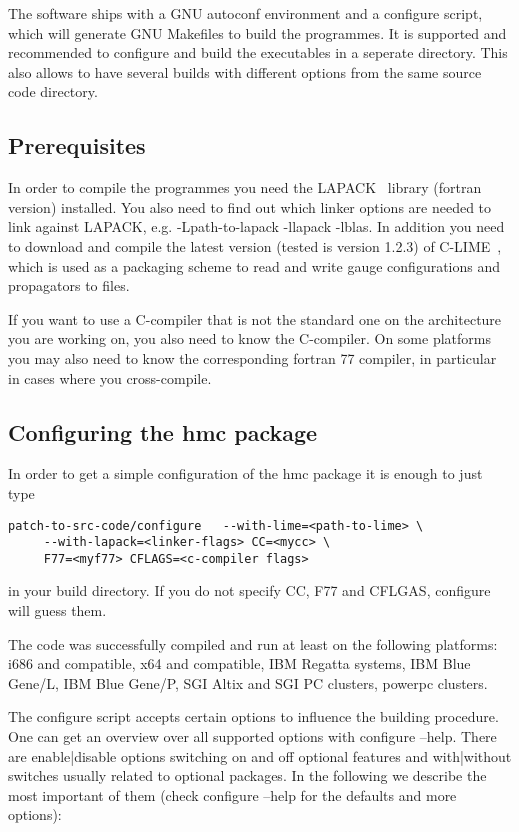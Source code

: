 The software ships with a GNU autoconf environment and a configure
script, which will generate GNU Makefiles to build the programmes. It
is supported and recommended to configure and build the executables in
a seperate directory. This also allows to have several builds with
different options from the same source code directory. 

\subsection{Prerequisites}

In order to compile the programmes you need the {\ttfamily
  LAPACK}~\cite{lapack:web} library (fortran version) installed. You also
need to find out which linker options are needed to link against
{\ttfamily LAPACK}, e.g. {\ttfamily -Lpath-to-lapack -llapack
  -lblas}. In addition you need to download and compile the latest
version (tested is version 1.2.3) of {\ttfamily
  C-LIME}~\cite{lime:web}, which is used as a packaging scheme to
read and write gauge configurations and propagators to files.

If you want to use a C-compiler that is not the standard one on the
architecture you are working on, you also need to know the
C-compiler. On some platforms you may also need to know the
corresponding fortran 77 compiler, in particular in cases where you
cross-compile. 

\subsection{Configuring the hmc package}
\label{sec:config}

In order to get a simple configuration of the hmc package it is enough
to just type 
\begin{verbatim}
patch-to-src-code/configure   --with-lime=<path-to-lime> \
     --with-lapack=<linker-flags> CC=<mycc> \
     F77=<myf77> CFLAGS=<c-compiler flags>
\end{verbatim}
in your build directory. If 
you do not  specify {\ttfamily CC, F77} and {\ttfamily CFLGAS},
{\ttfamily configure} will guess them.

The code was successfully compiled and run at least on the following
platforms: i686 and compatible, x64 and compatible, IBM Regatta
systems, IBM Blue Gene/L, IBM Blue Gene/P, SGI Altix and SGI PC
clusters, powerpc clusters.

The configure script accepts certain options to influence the building
procedure. One can get an overview over all supported options with
{\ttfamily configure --help}. There are {\ttfamily enable|disable}
options switching on and off optional features and {\ttfamily
  with|without} switches usually related to optional packages. In the
following we describe the most important of them (check {\ttfamily
  configure --help} for the defaults and more options):

